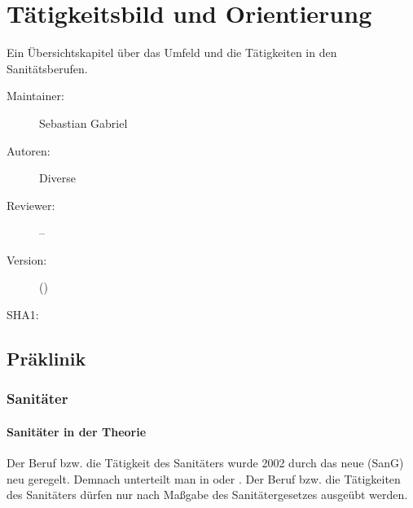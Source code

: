 % 
\def\ChapterCode{TAE}
\chapter
[\CO{[TAE]} Tätigkeitsbild und Orientierung]
{Tätigkeitsbild und Orientierung}
\label{chp:TAE}

\ChapterIntro
{%
Ein Übersichtskapitel über das Umfeld und die Tätigkeiten in
den Sanitätsberufen.

}
{%
\begin{description}
  \item[Maintainer:] Sebastian Gabriel
  \item[Autoren:] Diverse
  \item[Reviewer:] --
  \item[Version:] {\DocVersion} ({\DocVersionInfo})
  \item[SHA1:] {\DocGitCommit}
\end{description}

{\TxTeilkapitelAASS}
}



\clearpage
\section{Präklinik}

\subsection{Sanitäter}

\subsubsection{Sanitäter in der Theorie}

Der Beruf bzw. die Tätigkeit des Sanitäters wurde 2002 durch
das neue  (SanG) neu geregelt. Demnach
unterteilt man in  oder
. Der Beruf bzw. die Tätigkeiten des
Sanitäters dürfen nur nach Maßgabe des Sanitätergesetzes
 ausgeübt werden.

